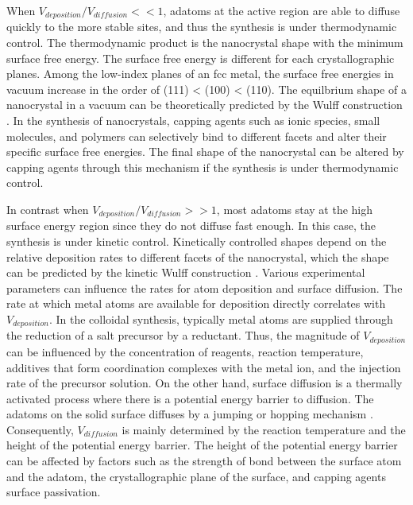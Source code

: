When $V_{deposition}/V_{diffusion} << 1$, adatoms at the active region are able to diffuse quickly to the more stable sites, and thus the synthesis is under thermodynamic control.
The thermodynamic product is the nanocrystal shape with the minimum surface free energy.
The surface free energy is different for each crystallographic planes.
Among the low-index planes of an fcc metal, the surface free energies in vacuum increase in the order of (111) < (100) < (110).
The equilbrium shape of a nanocrystal in a vacuum can be theoretically predicted by the Wulff construction \cite{Bodineau_1999}.
In the synthesis of nanocrystals, capping agents such as ionic species, small molecules, and polymers can selectively bind to different facets and alter their specific surface free energies.
The final shape of the nanocrystal can be altered by capping agents through this mechanism if the synthesis is under thermodynamic control.

In contrast when $V_{deposition}/V_{diffusion} >> 1$, most adatoms stay at the high surface energy region since they do not diffuse fast enough.
In this case, the synthesis is under kinetic control.
Kinetically controlled shapes depend on the relative deposition rates to different facets of the nanocrystal, which the shape can be predicted by the kinetic Wulff construction \cite{Zhang_2006}.
Various experimental parameters can influence the rates for atom deposition and surface diffusion.
The rate at which metal atoms are available for deposition directly correlates with $V_{deposition}$.
In the colloidal synthesis, typically metal atoms are supplied through the reduction of a salt precursor by a reductant.
Thus, the magnitude of $V_{deposition}$ can be influenced by the concentration of reagents, reaction temperature, additives that form coordination complexes with the metal ion, and the injection rate of the precursor solution.
On the other hand, surface diffusion is a thermally activated process where there is a potential energy barrier to diffusion.
The adatoms on the solid surface diffuses by a jumping or hopping mechanism \cite{Tringides_1997}.
Consequently, $V_{diffusion}$ is mainly determined by the reaction temperature and the height of the potential energy barrier.
The height of the potential energy barrier can be affected by factors such as the strength of bond between the surface atom and the adatom, the crystallographic plane of the surface, and capping agents surface passivation.
